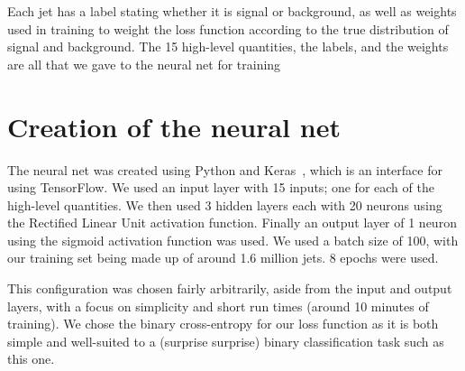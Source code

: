 \documentclass[11pt]{article}
\numberwithin{equation}{section}
\numberwithin{figure}{section}
\numberwithin{table}{section}
\begin{document}
Each jet has a label stating whether it is signal or background, as well as weights used in training to weight the loss function according to the true distribution of signal and background. The 15 high-level quantities, the labels, and the weights are all that we gave to the neural net for training

\section{Creation of the neural net}\label{sec:CreatingNeuralNet}
The neural net was created using Python and Keras~\cite{keras}, which is an interface for using TensorFlow. We used an input layer with 15 inputs; one for each of the high-level quantities. We then used 3 hidden layers each with 20 neurons using the Rectified Linear Unit activation function. Finally an output layer of 1 neuron using the sigmoid activation function was used. We used a batch size of 100, with our training set being made up of around 1.6 million jets. 8 epochs were used. 

This configuration was chosen fairly arbitrarily, aside from the input and output layers, with a focus on simplicity and short run times (around 10 minutes of training). We chose the binary cross-entropy for our loss function as it is both simple and well-suited to a (surprise surprise) binary classification task such as this one.

\newpage
\printbibliography
\end{document}
